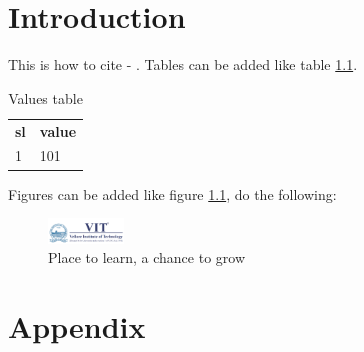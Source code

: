 \documentclass{capstone-project}
\begin{document}


\chapter{Introduction}

This is how to cite - \cite{einstein}.
Tables can be added like table \ref{tab:table1}.
\begin{table}[h]
    \begin{tabular}{ll}
        \textbf{sl} & \textbf{value} \\
        1           & 101            \\
    \end{tabular}
    \captionsetup{singlelinecheck = false, format= hang, justification=raggedright, font=footnotesize, labelsep=space}
    \caption{Values table}
    \label{tab:table1}
\end{table}
Figures can be added like figure \ref{fig:figure1}, do the following:
\begin{figure}[h]
    \centering
    \includegraphics[width=2cm]{assets/university.png}
    \caption{Place to learn, a chance to grow}
    \label{fig:figure1}
\end{figure}



\appendix
\chapter{Appendix}
\end{document}

